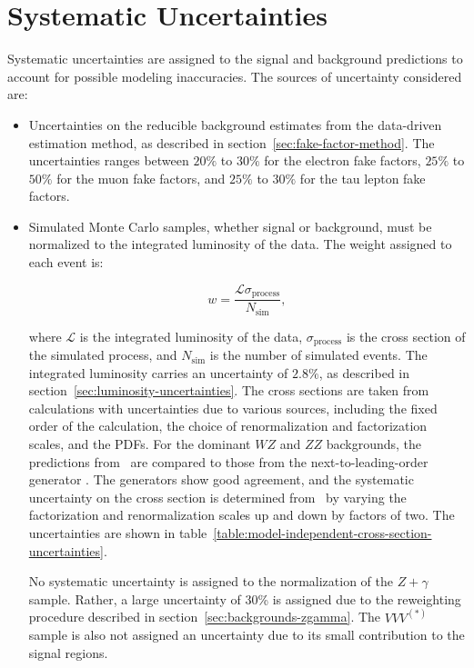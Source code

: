 \section{Systematic Uncertainties}\label{sec:model-independent-systematics}
Systematic uncertainties are assigned to the signal and background predictions to account for possible modeling inaccuracies. The sources of uncertainty considered are:

\begin{itemize}
	\item Uncertainties on the reducible background estimates from the data-driven estimation method, as described in section~\ref{sec:fake-factor-method}. The uncertainties ranges between $20\%$ to $30\%$ for the electron fake factors, $25\%$ to $50\%$ for the muon fake factors, and $25\%$ to $30\%$ for the tau lepton fake factors.

  \item  Simulated Monte Carlo samples, whether signal or background, must be normalized to the integrated luminosity of the data. The weight assigned to each event is:
  
  \begin{equation}
   w = \frac{\mathcal{L} \sigma_{\mathrm{process}}}{N_{\mathrm{sim}}},
  \end{equation}
  
  where $\mathcal{L}$ is the integrated luminosity of the data, $\sigma_{\mathrm{process}}$ is the cross section of the simulated process, and $N_{\mathrm{sim}}$ is the number of simulated events. The integrated luminosity carries an uncertainty of $2.8\%$, as described in section~\ref{sec:luminosity-uncertainties}. The cross sections are taken from calculations with uncertainties due to various sources, including the fixed order of the calculation, the choice of renormalization and factorization scales, and the PDFs. For the dominant $WZ$ and $ZZ$ backgrounds, the predictions from \sherpa\ are compared to those from the next-to-leading-order generator \vbfnlo. The generators show good agreement, and the systematic uncertainty on the cross section is determined from \vbfnlo\ by varying the factorization and renormalization scales up and down by factors of two. The uncertainties are shown in table~\ref{table:model-independent-cross-section-uncertainties}. 

  No systematic uncertainty is assigned to the normalization of the $Z+\gamma$ sample. Rather, a large uncertainty of 30\% is assigned due to the reweighting procedure described in section~\ref{sec:backgrounds-zgamma}. The $VVV^{(*)}$ sample is also not assigned an uncertainty due to its small contribution to the signal regions.
  

\end{itemize}
